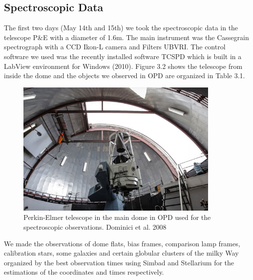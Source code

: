 \subsection{Spectroscopic Data}

The first two days (May 14th and 15th) we took the spectroscopic data in the telescope P\&E with a diameter of 1.6m. The main instrument was the Cassegrain spectrograph with a CCD Ikon-L camera and Filters UBVRI. The control software we used was the recently installed software TCSPD which is built in a LabView environment for Windows (2010). Figure 3.2 shows the telescope from inside the dome and the objects we observed in OPD are organized in Table 3.1.

\begin{figure}[H]
\centering
\includegraphics[width=10cm]{images/opd-spectrograph.jpg}
\caption[Perkin-Elmer telescope used for Spectroscopy]{Perkin-Elmer telescope in the main dome in OPD used for the spectroscopic observations. Dominici et al. 2008}
\end{figure}

We made the observations of dome flats, bias frames, comparison lamp frames, calibration stars, some galaxies and certain globular clusters of the milky Way organized by the best observation times using Simbad and Stellarium for the estimations of the coordinates and times respectively. 

